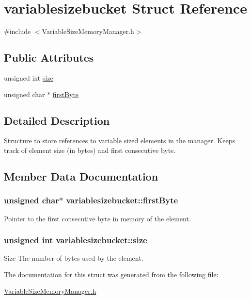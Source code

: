 \hypertarget{structvariablesizebucket}{
\section{variablesizebucket Struct Reference}
\label{structvariablesizebucket}
}


{\ttfamily \#include $<$VariableSizeMemoryManager.h$>$}

\subsection*{Public Attributes}
\begin{DoxyCompactItemize}
\item 
unsigned int \hyperlink{structvariablesizebucket_ad7a85039ddabc439eba67e788fc2abbb}{size}
\item 
unsigned char $\ast$ \hyperlink{structvariablesizebucket_a33316284b599a5e61a2735725073c019}{firstByte}
\end{DoxyCompactItemize}


\subsection{Detailed Description}
Structure to store references to variable sized elements in the manager. Keeps track of element size (in bytes) and first consecutive byte. 

\subsection{Member Data Documentation}
\hypertarget{structvariablesizebucket_a33316284b599a5e61a2735725073c019}{
\subsubsection[{firstByte}]{\setlength{\rightskip}{0pt plus 5cm}unsigned char$\ast$ {\bf variablesizebucket::firstByte}}}
\label{structvariablesizebucket_a33316284b599a5e61a2735725073c019}
Pointer to the first consecutive byte in memory of the element. \hypertarget{structvariablesizebucket_ad7a85039ddabc439eba67e788fc2abbb}{
\subsubsection[{size}]{\setlength{\rightskip}{0pt plus 5cm}unsigned int {\bf variablesizebucket::size}}}
\label{structvariablesizebucket_ad7a85039ddabc439eba67e788fc2abbb}
Size The number of bytes used by the element. 

The documentation for this struct was generated from the following file:\begin{DoxyCompactItemize}
\item 
\hyperlink{VariableSizeMemoryManager_8h}{VariableSizeMemoryManager.h}\end{DoxyCompactItemize}
